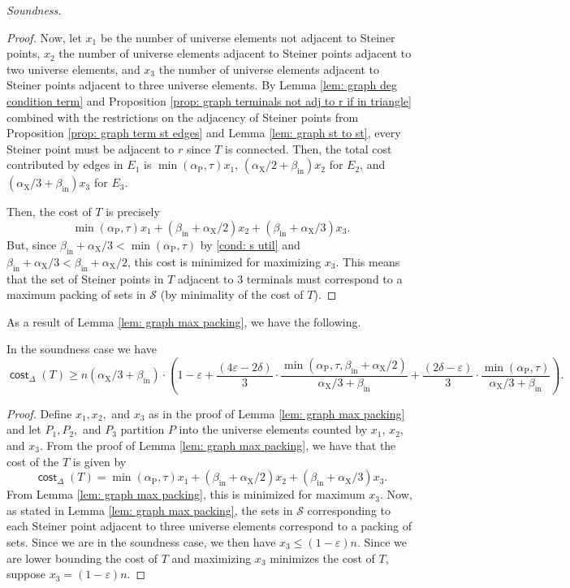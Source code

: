 \documentclass{theoretics}
\DeclareMathOperator{\cost}{\mathsf{cost}}
\newcommand{\1}{\textbf{1}}
\newcommand{\td}{\tau}
\newcommand{\srd}{\alpha_{\text{X}}}
\newcommand{\trd}{\alpha_{\text{P}}}
\begin{document}
\begin{paragraph}{\textit{Soundness.}}
\begin{proof}
Now, let $x_1$ be the number of universe elements not adjacent to Steiner points, $x_2$ the number of universe elements adjacent to Steiner points adjacent to two universe elements, and $x_3$ the number of universe elements adjacent to Steiner points adjacent to three universe elements. By Lemma \ref{lem: graph deg condition term} and Proposition \ref{prop: graph terminals not adj to r if in triangle} combined with the restrictions on the adjacency of Steiner points from Proposition \ref{prop: graph term st edges} and Lemma \ref{lem: graph st to st}, every Steiner point must be adjacent to $r$ since $T$ is connected. Then, the total cost contributed by edges in $E_1$ is $\min(\trd, \td)x_1$, $(\srd/2 + \beta_{\text{in}})x_2$ for $E_2$, and $(\srd/3 + \beta_{\text{in}})x_3$ for $E_3$.



Then, the cost of $T$ is precisely 
\[
\min(\trd, \td) x_1  + (\beta_{\text{in}} + \srd/2)x_2 + (\beta_{\text{in}} + \srd/3)x_3.
\]
But, since $\beta_{\text{in}} + \srd/3 < \min(\trd, \td)$
by \ref{cond: s util} and $\beta_{\text{in}} + \srd/3 <\beta_{\text{in}} + \srd/2$,
this cost is minimized for maximizing $x_3$. This means that the set of Steiner points in $T$ adjacent to $3$ terminals must correspond to a maximum packing of sets in $\mathcal{S}$ (by minimality of the cost of $T$).
 \end{proof}
 
 As a result of Lemma \ref{lem: graph max packing}, we have the following.
 \begin{corollary}
 In the soundness case we have
\[
\cost_\Delta(T) \geq n(\srd/3+\beta_{\text{in}})\cdot \left(1 - \varepsilon  + \frac{(4\varepsilon  - 2\delta)}{3} \cdot \frac{\min(\trd, \td, \beta_{\text{in}} + \srd/2)}{\srd/3+\beta_{\text{in}}} + \frac{(2\delta  - \varepsilon)}{3} \cdot \frac{\min(\trd, \td)}{\srd/3+\beta_{\text{in}}} \right).
\]
 \end{corollary}
 \begin{proof}
 Define $x_1, x_2,$ and $x_3$ as in the proof of Lemma \ref{lem: graph max packing} and let $P_1, P_2,$ and $P_3$ partition $P$ into the universe elements counted by $x_1$, $x_2$, and $x_3$.  From the proof of Lemma \ref{lem: graph max packing}, we have that the cost of the $T$ is given by 
 \[
 \cost_{\Delta}(T) = \min(\trd, \td) x_1  + (\beta_{\text{in}} + \srd/2)x_2 + (\beta_{\text{in}} + \srd/3)x_3.
 \]
 From Lemma \ref{lem: graph max packing}, this is minimized for maximum $x_3$. Now, as stated in Lemma \ref{lem: graph max packing}, the sets in $\mathcal{S}$ corresponding to each Steiner point adjacent to three universe elements correspond to a packing of sets. Since we are in the soundness case,  we then have $x_3 \leq (1 - \varepsilon)n$. Since we are lower bounding the cost of $T$ and maximizing $x_3$ minimizes the cost of $T$, suppose  $x_3 = (1 - \varepsilon)n$. 
 

\end{proof}
\end{paragraph}
\end{document}
